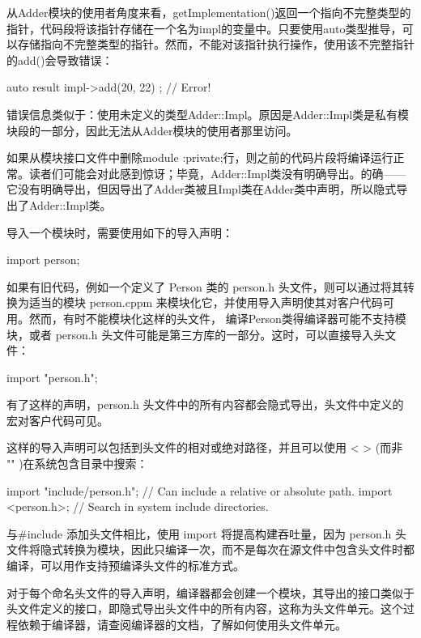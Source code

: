 从Adder模块的使用者角度来看，getImplementation()返回一个指向不完整类型的指针，代码段将该指针存储在一个名为impl的变量中。只要使用auto类型推导，可以存储指向不完整类型的指针。然而，不能对该指针执行操作，使用该不完整指针的add()会导致错误：

\begin{cpp}
auto result { impl->add(20, 22) }; // Error!
\end{cpp}

错误信息类似于：使用未定义的类型Adder::Impl。原因是Adder::Impl类是私有模块段的一部分，因此无法从Adder模块的使用者那里访问。

如果从模块接口文件中删除module :private;行，则之前的代码片段将编译运行正常。读者们可能会对此感到惊讶；毕竟，Adder::Impl类没有明确导出。的确——它没有明确导出，但因导出了Adder类被且Impl类在Adder类中声明，所以隐式导出了Adder::Impl类。


导入一个模块时，需要使用如下的导入声明：

\begin{cpp}
import person;
\end{cpp}

如果有旧代码，例如一个定义了 Person 类的 person.h 头文件，则可以通过将其转换为适当的模块 person.cppm 来模块化它，并使用导入声明使其对客户代码可用。然而，有时不能模块化这样的头文件， 编译Person类得编译器可能不支持模块，或者 person.h 头文件可能是第三方库的一部分。这时，可以直接导入头文件：

\begin{cpp}
import "person.h";
\end{cpp}

有了这样的声明，person.h 头文件中的所有内容都会隐式导出，头文件中定义的宏对客户代码可见。

这样的导入声明可以包括到头文件的相对或绝对路径，并且可以使用 < > (而非 "" )在系统包含目录中搜索：

\begin{cpp}
import "include/person.h"; // Can include a relative or absolute path.
import <person.h>; // Search in system include directories.
\end{cpp}

与\#include 添加头文件相比，使用 import 将提高构建吞吐量，因为 person.h 头文件将隐式转换为模块，因此只编译一次，而不是每次在源文件中包含头文件时都编译，可以用作支持预编译头文件的标准方式。

对于每个命名头文件的导入声明，编译器都会创建一个模块，其导出的接口类似于头文件定义的接口，即隐式导出头文件中的所有内容，这称为头文件单元。这个过程依赖于编译器，请查阅编译器的文档，了解如何使用头文件单元。

